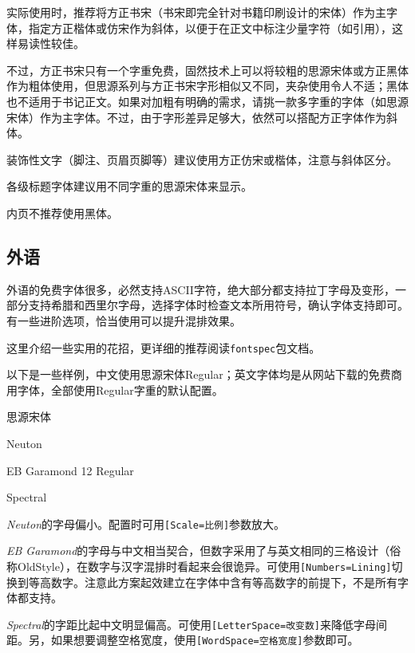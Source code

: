 \documentclass[10pt,openany]{book}
\begin{document}
实际使用时，推荐将方正书宋（书宋即完全针对书籍印刷设计的宋体）作为主字体，指定方正楷体或仿宋作为斜体，以便于在正文中标注少量字符（如引用），这样易读性较佳。

不过，方正书宋只有一个字重免费，固然技术上可以将较粗的思源宋体或方正黑体作为粗体使用，但思源系列与方正书宋字形相似又不同，夹杂使用令人不适；黑体也不适用于书记正文。如果对加粗有明确的需求，请挑一款多字重的字体（如思源宋体）作为主字体。不过，由于字形差异足够大，依然可以搭配方正字体作为斜体。

装饰性文字（脚注、页眉页脚等）建议使用方正仿宋或楷体，注意与斜体区分。

各级标题字体建议用不同字重的思源宋体来显示。

内页不推荐使用黑体。

\subsection{外语}

外语的免费字体很多，必然支持ASCII字符，绝大部分都支持拉丁字母及变形，一部分支持希腊和西里尔字母，选择字体时检查文本所用符号，确认字体支持即可。有一些进阶选项，恰当使用可以提升混排效果。

这里介绍一些实用的花招，更详细的推荐阅读\texttt{fontspec}包文档。

以下是一些样例，中文使用思源宋体Regular；英文字体均是从网站下载的免费商用字体，全部使用Regular字重的默认配置。

\begin{adjustwidth}{2em}{2em}
    \blankpar

    思源宋体\testtext

    Neuton\testtext

    EB Garamond 12 Regular\testtext

    Spectral\testtext

    \blankpar
\end{adjustwidth}

\textit{Neuton}的字母偏小。配置时可用\texttt{[Scale=比例]}参数放大。

\textit{EB Garamond}的字母与中文相当契合，但数字采用了与英文相同的三格设计（俗称OldStyle），在数字与汉字混排时看起来会很诡异。可使用\texttt{[Numbers=Lining]}切换到等高数字。注意此方案起效建立在字体中含有等高数字的前提下，不是所有字体都支持。

\textit{Spectral}的字距比起中文明显偏高。可使用\texttt{[LetterSpace=改变数]}来降低字母间距。另，如果想要调整空格宽度，使用\texttt{[WordSpace=空格宽度]}参数即可。
\end{document}
